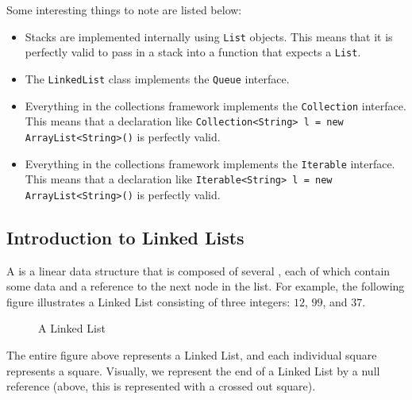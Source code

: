 Some interesting things to note are listed below:
\begin{itemize}
    \item Stacks are implemented internally using \verb!List! objects. This means that it is perfectly valid to pass in a stack into a function that expects a \verb!List!. 
    \item The \verb!LinkedList! class implements the \verb!Queue! interface. 
    \item Everything in the collections framework implements the \verb!Collection! interface. This means that a declaration like \verb!Collection<String> l = new ArrayList<String>()! is perfectly valid.
    \item Everything in the collections framework implements the \verb!Iterable! interface. This means that a declaration like \verb!Iterable<String> l = new ArrayList<String>()! is perfectly valid.
\end{itemize}



\subsection{Introduction to Linked Lists}  
A  is a linear data structure that is composed of several , each of which contain some data and a reference to the next node in the list. For example, the following figure illustrates a Linked List consisting of three integers: $12$, $99$, and $37$. 

\begin{figure}[h]
\centering
{}
\caption{A Linked List}
\end{figure}

The entire figure above represents a Linked List, and each individual square represents a square. Visually, we represent the end of a Linked List by a null reference (above, this is represented with a crossed out square).  

